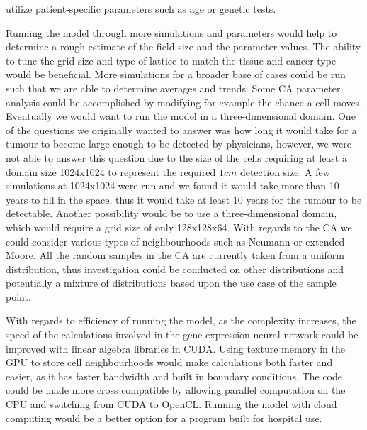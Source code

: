 \documentclass[\main/thesis.tex]{subfiles}
\begin{document}
utilize patient-specific parameters such as age or genetic tests.

Running the model through more simulations and parameters would help to determine a rough estimate of the field size and the parameter values. The ability to tune the grid size and type of lattice to match the tissue and cancer type would be beneficial. More simulations for a broader base of cases could be run such that we are able to determine averages and trends. Some CA parameter analysis could be accomplished by modifying for example the chance a cell moves. Eventually we would want to run the model in a three-dimensional domain. One of the questions we originally wanted to answer was how long it would take for a tumour to become large enough to be detected by physicians, however, we were not able to answer this question due to the size of the cells requiring at least a domain size 1024x1024 to represent the required $1 cm$ detection size. A few simulations at 1024x1024 were run and we found it would take more than 10 years to fill in the space, thus it would take at least 10 years for the tumour to be detectable. Another possibility would be to use a three-dimensional domain, which would require a grid size of only 128x128x64. With regards to the CA we could consider various types of neighbourhoods such as Neumann or extended Moore. All the random samples in the CA are currently taken from a uniform distribution, thus investigation could be conducted on other distributions and potentially a mixture of distributions based upon the use case of the sample point.

With regards to efficiency of running the model, as the complexity increases, the speed of the calculations involved in the gene expression neural network could be improved with linear algebra libraries in CUDA. Using texture memory in the GPU to store cell neighbourhoods would make calculations both faster and easier, as it has faster bandwidth and built in boundary conditions. The code could be made more cross compatible by allowing parallel computation on the CPU and switching from CUDA to OpenCL. Running the model with cloud computing would be a better option for a program built for hospital use.
\end{document}
